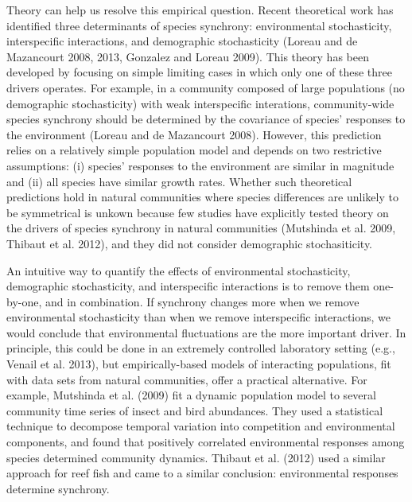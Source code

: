 \documentclass[12pt,]{article}
\begin{document}
Theory can help us resolve this empirical question.
Recent theoretical work has identified three determinants of species
synchrony: environmental stochasticity, interspecific interactions, and
demographic stochasticity (Loreau and {{de Mazancourt}} 2008, 2013,
Gonzalez and Loreau 2009).
This theory has been developed by focusing on simple limiting cases in which only one of these three drivers operates.
For example, in a community composed of large populations (no
demographic stochasticity) with weak interspecific interations,
community-wide species synchrony should be determined by the covariance
of species' responses to the environment (Loreau and {{de Mazancourt}}
2008). However, this prediction relies on a relatively simple population
model and depends on two restrictive assumptions: (i)
species' responses to the environment are similar in magnitude and (ii)
all species have similar growth rates. Whether such theoretical
predictions hold in natural communities where species differences are
unlikely to be symmetrical is unkown because few studies have explicitly
tested theory on the drivers of species synchrony in natural communities
(Mutshinda et al. 2009, Thibaut et al. 2012), and they did not consider
demographic stochasiticity.

An intuitive way to quantify the effects of environmental stochasticity,
demographic stochasticity, and interspecific interactions is to remove
them one-by-one, and in combination.
If synchrony changes more when we remove environmental stochasticity than when we remove interspecific interactions, we would conclude that environmental fluctuations are the more important driver.
In principle, this could be done in an extremely controlled laboratory
setting (e.g., Venail et al. 2013), but empirically-based models of
interacting populations, fit with data sets from natural communities,
offer a practical alternative. For example, Mutshinda et al. (2009) fit
a dynamic population model to several community time series of insect
and bird abundances. They used a statistical technique to decompose
temporal variation into competition and environmental components, and
found that positively correlated environmental responses among species
determined community dynamics. Thibaut et al. (2012) used a similar
approach for reef fish and came to a similar conclusion: environmental
responses determine synchrony.
\end{document}
